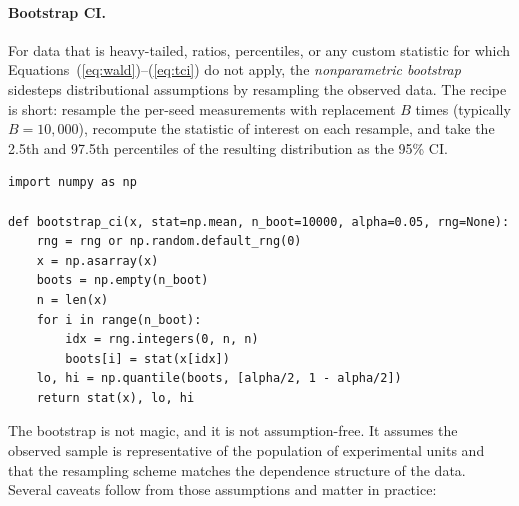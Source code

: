 \documentclass[11pt]{article}
\begin{document}
\paragraph{Bootstrap CI.}
\label{sec:bootstrap}
For data that is heavy-tailed, ratios, percentiles, or any custom statistic for which Equations~(\ref{eq:wald})--(\ref{eq:tci}) do not apply, the \emph{nonparametric bootstrap} \citep{efron1993introduction} sidesteps distributional assumptions by resampling the observed data. The recipe is short: resample the per-seed measurements with replacement $B$ times (typically $B = 10{,}000$), recompute the statistic of interest on each resample, and take the 2.5th and 97.5th percentiles of the resulting distribution as the 95\% CI.

\begin{lstlisting}[caption={Bootstrap 95\% CI for the mean.},label={lst:bootstrap}]
import numpy as np

def bootstrap_ci(x, stat=np.mean, n_boot=10000, alpha=0.05, rng=None):
    rng = rng or np.random.default_rng(0)
    x = np.asarray(x)
    boots = np.empty(n_boot)
    n = len(x)
    for i in range(n_boot):
        idx = rng.integers(0, n, n)
        boots[i] = stat(x[idx])
    lo, hi = np.quantile(boots, [alpha/2, 1 - alpha/2])
    return stat(x), lo, hi
\end{lstlisting}

The bootstrap is not magic, and it is not assumption-free. It assumes the observed sample is representative of the population of experimental units and that the resampling scheme matches the dependence structure of the data. Several caveats follow from those assumptions and matter in practice:
\end{document}
